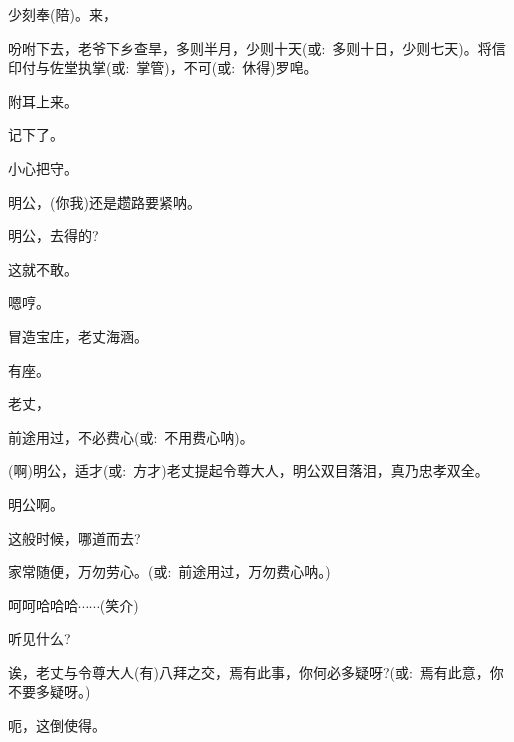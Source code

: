{少刻奉(陪)。来，

吩咐下去，老爷下乡查旱，多则半月，少则十天({\akai 或}:~多则十日，少则七天)。将信印付与佐堂执掌({\akai 或}:~掌管)，不可({\akai 或}:~休得)罗唣。

附耳上来。

记下了。

小心把守。

\vspace{5pt}



明公，(你我)还是趱路要紧呐。

明公，去得的?

这就不敢。

嗯哼。

冒造宝庄，老丈海涵。

有座。

老丈，


前途用过，不必费心({\akai 或}:~不用费心呐)。

(啊)明公，适才({\akai 或}:~方才)老丈提起令尊大人，明公双目落泪，真乃忠孝双全。

明公啊。


这般时候，哪道而去?

家常随便，万勿劳心。({\akai 或}:~前途用过，万勿费心呐。)

呵呵哈哈哈$\cdots{}\cdots{}$({\hwfs 笑}{\hwfs 介})


听见什么?

诶，老丈与令尊大人(有)八拜之交，焉有此事，你何必多疑呀?({\akai 或}:~焉有此意，你不要多疑呀。)

呃，这倒使得。


}
